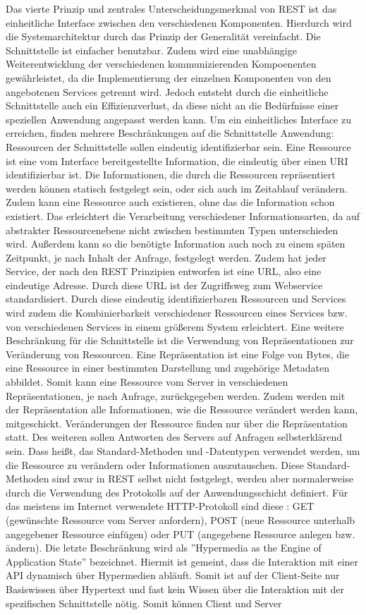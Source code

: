 Das vierte Prinzip und zentrales Unterscheidungsmerkmal von REST ist das einheitliche Interface zwischen den verschiedenen Komponenten. Hierdurch wird die Systemarchitektur durch das Prinzip der Generalität vereinfacht. Die Schnittstelle ist einfacher benutzbar. Zudem wird eine unabhängige Weiterentwicklung der verschiedenen kommunizierenden Kompoenenten gewährleistet, da die Implementierung der einzelnen Komponenten von den angebotenen Services getrennt wird. Jedoch entsteht durch die einheitliche Schnittstelle auch ein Effizienzverlust, da diese nicht an die Bedürfnisse einer speziellen Anwendung angepasst werden kann.
Um ein einheitliches Interface zu erreichen, finden mehrere Beschränkungen auf die Schnittstelle Anwendung: Ressourcen der Schnittstelle sollen eindeutig identifizierbar sein. Eine Ressource ist eine vom Interface bereitgestellte Information, die eindeutig über einen URI identifizierbar ist. Die Informationen, die durch die Ressourcen repräsentiert werden können statisch festgelegt sein, oder sich auch im Zeitablauf verändern. Zudem kann eine Ressource auch existieren, ohne das die Information schon existiert. Das erleichtert die Verarbeitung verschiedener Informationsarten, da auf abstrakter Ressourcenebene nicht zwischen bestimmten Typen unterschieden wird. Au{\ss}erdem kann so die benötigte Information auch noch zu einem späten Zeitpunkt, je nach Inhalt der Anfrage, festgelegt werden. Zudem hat jeder Service, der nach den REST Prinzipien entworfen ist eine URL, also eine eindeutige Adresse. Durch diese URL ist der Zugriffsweg zum Webservice standardisiert. Durch diese eindeutig identifizierbaren Ressourcen und Services wird zudem die Kombinierbarkeit verschiedener Ressourcen eines Services bzw. von verschiedenen Services in einem grö{\ss}erem System erleichtert. Eine weitere Beschränkung für die Schnittstelle ist die Verwendung von Repräsentationen zur Veränderung von Ressourcen. Eine Repräsentation ist eine Folge von Bytes, die eine Ressource in einer bestimmten Darstellung und zugehörige Metadaten abbildet. Somit kann eine Ressource vom Server in verschiedenen Repräsentationen, je nach Anfrage, zurückgegeben werden. Zudem werden mit der Repräsentation alle Informationen, wie die Ressource verändert werden kann, mitgeschickt. Veränderungen der Ressource finden nur über die Repräsentation statt. Des weiteren sollen Antworten des Servers auf Anfragen selbsterklärend sein. Dass hei{\ss}t, das Standard-Methoden und -Datentypen verwendet werden, um die Ressource zu verändern oder Informationen auszutauschen. Diese Standard-Methoden sind zwar in REST selbst nicht festgelegt, werden aber normalerweise durch die Verwendung des Protokolls auf der Anwendungsschicht definiert. Für das meistens im Internet verwendete HTTP-Protokoll sind diese \zB: GET (gewünschte Ressource vom Server anfordern), POST (neue Ressource unterhalb angegebener Ressource einfügen) oder PUT (angegebene Ressource anlegen bzw. ändern). Die letzte Beschränkung wird als ''Hypermedia as the Engine of Application State'' bezeichnet. Hiermit ist gemeint, dass die Interaktion mit einer API dynamisch über Hypermedien abläuft. Somit ist auf der Client-Seite nur Basiswissen über Hypertext und fast kein Wissen über die Interaktion mit der spezifischen Schnittstelle nötig. Somit können Client und Server 